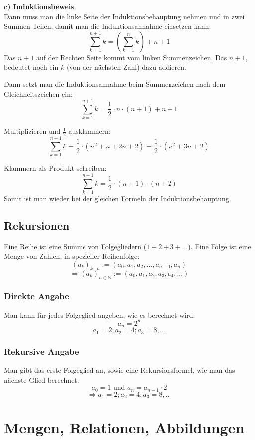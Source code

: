 \textbf{c) Induktionsbeweis} \\
Dann muss man die linke Seite der Induktionsbehauptung nehmen und in zwei Summen Teilen,
damit man die Induktionsannahme einsetzen kann:
 \[ \sum\limits_{k=1}^{n+1} k = \left( \sum\limits_{k=1}^{n} k \right) + n + 1 \]
Das $n + 1$ auf der Rechten Seite kommt vom linken Summenzeichen.
Das $n + 1$, bedeutet noch ein $k$ (von der nächsten Zahl) dazu addieren.

Dann setzt man die Induktionsannahme beim Summenzeichen nach dem
Gleichheitszeichen ein:
 \[ \sum\limits_{k=1}^{n+1} k = \frac{1}{2} \cdot n \cdot (n + 1) + n + 1 \]

Multiplizieren und $\frac{1}{2}$ ausklammern:
 \[ \sum\limits_{k=1}^{n+1} k = \frac{1}{2} \cdot (n^2 + n + 2n + 2) =
 \frac{1}{2} \cdot (n^2 + 3n + 2) \]

Klammern als Produkt schreiben:
 \[ \sum\limits_{k=1}^{n+1} k = \frac{1}{2} \cdot (n + 1) \cdot (n + 2)\]
Somit ist man wieder bei der gleichen Formeln der Induktionsbehauptung.

\subsection{Rekursionen}
Eine Reihe ist eine Summe von Folgegliedern ($1 + 2 + 3 + ...$). Eine Folge ist eine Menge
von Zahlen, in spezieller Reihenfolge:
\[ (a_k)_{k...n} := (a_0, a_1, a_2, ..., a_{n-1}, a_n) \]
\[ \Rightarrow (a_k)_{n \in \mathbb{N}} := (a_0, a_1, a_2, a_3, a_4, ...) \]
\subsubsection{Direkte Angabe}
Man kann für jedes Folgeglied angeben, wie es berechnet wird:
\[ a_n = 2^n \]
\[ a_1 = 2; a_2 = 4; a_3 = 8, ... \]
\subsubsection{Rekursive Angabe}
Man gibt das erste Folgeglied an, sowie eine Rekursionsformel,
wie man das nächste Glied berechnet.
\[a_0 = 1 \text{ und } a_n = a_{n-1} \cdot 2 \]
\[ \Rightarrow a_1 = 2; a_2 = 4; a_3 = 8, ... \]

\section{Mengen, Relationen, Abbildungen}

